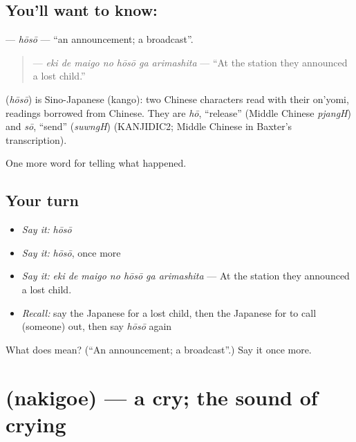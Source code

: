 \subsection*{You'll want to know: }
\textbf{} — \emph{hōsō} — \textquotedblleft{}an announcement; a broadcast\textquotedblright{}.

\begin{quote}
\textbf{   } — \emph{eki de maigo no hōsō ga arimashita} — \textquotedblleft{}At the station they announced a lost child.\textquotedblright{}
\end{quote}

\begin{cousinweb}
\textbf{} (\emph{hōsō}) is Sino-Japanese (kango): two Chinese characters read with their on'yomi, readings borrowed from Chinese. They are \emph{hō}, \textquotedblleft{}release\textquotedblright{} (Middle Chinese \emph{pjangH}) and \emph{sō}, \textquotedblleft{}send\textquotedblright{} (\emph{suwngH}) (KANJIDIC2; Middle Chinese in Baxter's transcription).
\end{cousinweb}

\begin{grammarlens}[title={What you've built}]
One more word for telling what happened.
\end{grammarlens}

\subsection*{Your turn}
\begin{itemize}
\raggedright
  \item \emph{Say it:} \emph{hōsō}
  \item \emph{Say it:} \emph{hōsō}, once more
  \item \emph{Say it:} \emph{eki de maigo no hōsō ga arimashita} — At the station they announced a lost child.
  \item \emph{Recall:} say the Japanese for a lost child, then the Japanese for to call (someone) out, then say \emph{hōsō} again
\end{itemize}

\begin{tcolorbox}[breakable,colback=teal!4,colframe=teal!35!black,title={Before you move on}]
What does  mean? (\textquotedblleft{}An announcement; a broadcast\textquotedblright{}.) Say it once more.
\end{tcolorbox}
\section[\texorpdfstring{\ja{なきごえ} (nakigoe)}{なきごえ (nakigoe)}]{ (nakigoe) — a cry; the sound of crying}

